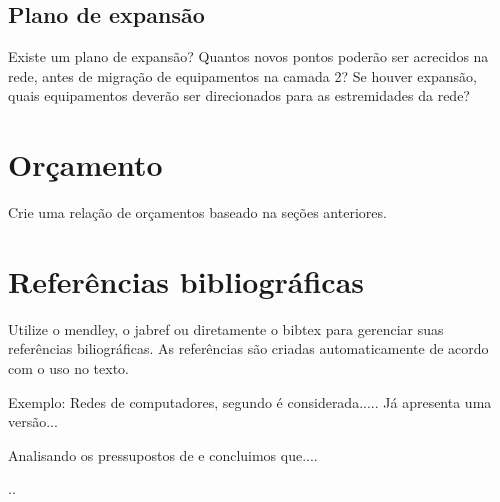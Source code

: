 \documentclass[	DIV=calc,%
							paper=a4,%
							fontsize=12pt,%
							onecolumn]{scrartcl}	 					%
\begin{document}
\subsection{Plano de expansão}
Existe um plano de expansão? Quantos novos pontos poderão ser acrecidos na rede, antes de migração de equipamentos na camada 2? Se houver expansão, quais equipamentos deverão ser direcionados para as estremidades da rede? 


\section{Orçamento}
Crie uma relação de orçamentos baseado na seções anteriores.

\section{Referências bibliográficas}
Utilize o mendley, o jabref ou diretamente o bibtex para gerenciar suas referências biliográficas. As referências são criadas automaticamente de acordo com o uso no texto.

Exemplo: Redes de computadores, segundo \cite{t2013} é considerada..... Já \cite{kurose2010} apresenta uma versão...

Analisando os pressupostos de \cite{ref3} e \cite{ref4} concluimos que....


\renewcommand\refname{} %

  

..
\end{document}

